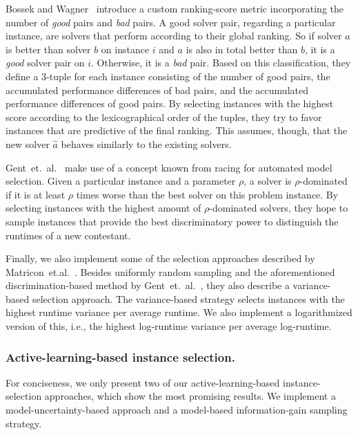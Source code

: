 \documentclass[runningheads]{llncs}
\begin{document}
Bossek and Wagner~\cite{Bossek021a} introduce a custom ranking-score metric incorporating the number of \emph{good} pairs and \emph{bad} pairs.
A good solver pair, regarding a particular instance, are solvers that perform according to their global ranking.
So if solver $a$ is better than solver $b$ on instance $i$ and $a$ is also in total better than $b$, it is a \emph{good} solver pair on $i$.
Otherwise, it is a \emph{bad} pair.
Based on this classification, they define a 3-tuple for each instance consisting of the number of good pairs, the accumulated performance differences of bad pairs, and the accumulated performance differences of good pairs.
By selecting instances with the highest score according to the lexicographical order of the tuples, they try to favor instances that are predictive of the final ranking.
This assumes, though, that the new solver $\hat{a}$ behaves similarly to the existing solvers.

Gent~et.~al.~\cite{GentHJKMNN14} make use of a concept known from racing for automated model selection.
Given a particular instance and a parameter $\rho$, a solver is $\rho$-dominated if it is at least $\rho$ times worse than the best solver on this problem instance.
By selecting instances with the highest amount of $\rho$-dominated solvers, they hope to sample instances that provide the best discriminatory power to distinguish the runtimes of a new contestant.

Finally, we also implement some of the selection approaches described by Matricon~et.al.~\cite{MatriconAFSH21}.
Besides uniformly random sampling and the aforementioned discrimination-based method by Gent~et.~al.~\cite{GentHJKMNN14}, they also describe a variance-based selection approach.
The variance-based strategy selects instances with the highest runtime variance per average runtime.
We also implement a logarithmized version of this, i.e., the highest log-runtime variance per average log-runtime.
 
\subsubsection{Active-learning-based instance selection.}
\label{sec:sampling2}
For conciseness, we only present two of our active-learning-based instance-selection approaches, which show the most promising results.
We implement a model-uncertainty-based approach and a model-based information-gain sampling strategy.
\end{document}
